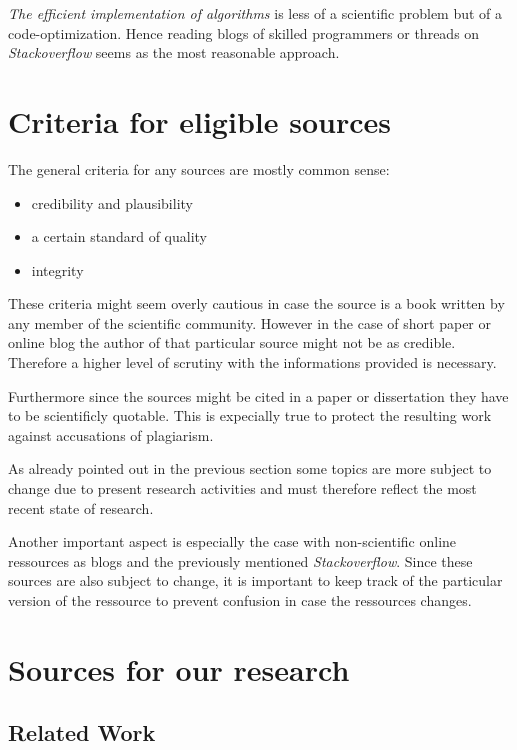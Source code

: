 \documentclass[titlepage, a4paper, 11pt]{scrartcl}
\begin{document}
    \textit{The efficient implementation of algorithms} is less of a scientific problem but of a code-optimization. Hence reading blogs of skilled programmers or threads on
    \textit{Stackoverflow} seems as the most reasonable approach.

    \section{Criteria for eligible sources}

    The general criteria for any sources are mostly common sense:

    \begin{itemize}
        \item credibility and plausibility
        \item a certain standard of quality
        \item integrity
    \end{itemize}

    These criteria might seem overly cautious in case the source is a book written by any member of the scientific community. However in the case of short paper or online blog
    the author of that particular source might not be as credible. Therefore a higher level of scrutiny with the informations provided is necessary.

    Furthermore since the sources might be cited in a paper or dissertation they have to be scientificly quotable. This is expecially true to protect the resulting work against 
    accusations of plagiarism.

    As already pointed out in the previous section some topics are more subject to change due to present research activities
    and must therefore reflect the most recent state of research. 

    Another important aspect is especially the case with non-scientific online ressources as blogs and the previously mentioned
    \textit{Stackoverflow}. Since these sources are also subject to change, it is important to keep track of the particular
    version of the ressource to prevent confusion in case the ressources changes.

    \section{Sources for our research}

        \subsection{Related Work}
\end{document}

